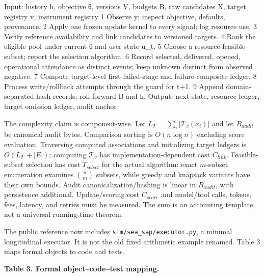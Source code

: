 \documentclass[
  11pt]{article}
\newenvironment{Shaded}{}{}
\newcommand{\NormalTok}[1]{#1}
\begin{document}
\begin{Shaded}
\begin{Highlighting}[]
\NormalTok{Input: history h, objective θ, versions V, budgets B,}
\NormalTok{       raw candidates X, target registry v, instrument registry}
\NormalTok{ 1  Observe y; inspect objective, defaults, provenance.}
\NormalTok{ 2  Apply one frozen update kernel to every signal; log resource use.}
\NormalTok{ 3  Verify reference availability and link candidates to versioned targets.}
\NormalTok{ 4  Rank the eligible pool under current θ and user state u\_t.}
\NormalTok{ 5  Choose a resource{-}feasible subset; report the selection algorithm.}
\NormalTok{ 6  Record selected, delivered, opened, operational attendance as}
\NormalTok{    distinct events; keep unknown distinct from observed negative.}
\NormalTok{ 7  Compute target{-}level first{-}failed{-}stage and failure{-}composite ledger.}
\NormalTok{ 8  Process write/rollback attempts through the guard for t+1.}
\NormalTok{ 9  Append domain{-}separated hash records; roll forward B and h.}
\NormalTok{Output: next state, resource ledger, target omission ledger, audit anchor}
\end{Highlighting}
\end{Shaded}

The complexity claim is component-wise. Let
\(L_{\mathcal T}=\sum_i|\mathcal T_v(x_i)|\) and let \(B_{audit}\) be
canonical audit bytes. Comparison sorting is \(O(n\log n)\) excluding
score evaluation. Traversing computed associations and initializing
target ledgers is \(O(L_{\mathcal T}+|E|)\); computing \(\mathcal T_v\)
has implementation-dependent cost \(C_{link}\). Feasible-subset
selection has cost \(T_{select}\) for the actual algorithm: exact
\(m\)-subset enumeration examines \(\binom nm\) subsets, while greedy
and knapsack variants have their own bounds. Audit
canonicalization/hashing is linear in \(B_{audit}\), with persistence
additional. Update/scoring cost \(C_{score}\) and model/tool calls,
tokens, fees, latency, and retries must be measured. The sum is an
accounting template, not a universal running-time theorem.

The public reference now includes \texttt{sim/sea\_sap/executor.py}, a
minimal longitudinal executor. It is not the old fixed arithmetic
example renamed. Table 3 maps formal objects to code and tests.

\textbf{Table 3. Formal object--code--test mapping.}
\end{document}
